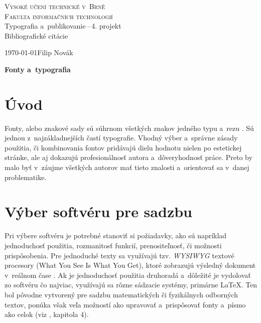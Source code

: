\documentclass[a4paper, 11pt]{article}
\begin{document}
\begin{titlepage}
    \begin{center}
        \textsc{\Huge{Vysoké učení technické v~Brně\\[0.4em]} %
        \huge{Fakulta informačních technologií}}\\        
        \LARGE{Typografia a~publikovanie\,--\,4. projekt}\\
        \Huge{Bibliografické citácie}\\
    \end{center}
    \Large{\today\hfill Filip Novák}
\end{titlepage}

\begin{center}
    \Huge{\textbf{Fonty a~typografia}}
\end{center}

\section*{Úvod}
Fonty, alebo znakové sady sú súhrnom všetkých znakov jedného typu a~rezu \cite{Rybicka_latex}. Sú jednou z~najzákladnejších častí typografie. Vhodný výber a~správne zásady použitia, či kombinovania
fontov pridávajú dielu hodnotu nielen po estetickej stránke, ale aj dokazujú profesionálnosť autora a~dôveryhodnosť práce.
Preto by malo byť v~záujme všetkých autorov mať tieto znalosti a~orientovať sa v~danej problematike.

\section{Výber softvéru pre sadzbu}
Pri výbere softvéru je potrebné stanoviť si požiadavky, ako sú napríklad jednoduchosť použitia, rozmanitosť funkcií,
prenositeľnosť, či možnosti prispôsobenia. Pre jednoduché texty sa využívajú tzv. \emph{WYSIWYG} textové procesory (What You See Is What You Get),
ktoré zobrazujú výsledný dokument v~reálnom čase \cite{Lukes_diploma}. Ak je jednoduchosť použitia druhoradá a~dôležité je vydolovať zo softvéru čo najviac,
využívajú sa rôzne sádzacie systémy, primárne \LaTeX \cite{Lukes_diploma, Found_latex}. Ten bol pôvodne vytvorený pre sadzbu
matematických či fyzikálnych odborných textov, ponúka však veľa možností ako upravovať a~prispôsovať fonty a~písmo ako celok (viz \cite{Helmut_latex}, kapitola 4).
\end{document}
